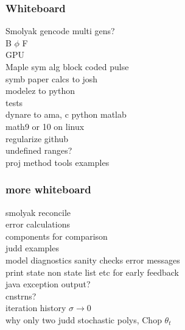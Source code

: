 \documentclass[tikz]{beamer}
\begin{document}
\begin{frame}
  \frametitle{Whiteboard}
  \begin{description}
  \item[Smolyak gencode multi gens?]
  \item[B $\phi$ F]
  \item[GPU]
  \item[Maple sym alg block coded pulse]
  \item[symb paper calcs to josh]
  \item[modelez to python]
  \item[tests]
  \item[dynare to ama, c python matlab]
  \item[math9 or 10 on linux]
  \item[regularize github]
  \item[undefined ranges?]
  \item[proj method tools examples] 
  \end{description}
\end{frame}

\begin{frame}
  \frametitle{more whiteboard}
  \begin{description}
  \item[smolyak reconcile]
  \item[error calculations]
  \item[components for comparison]
  \item[judd examples]
  \item[model diagnostics sanity checks error messages ]
  \item[print state non state list etc for early feedback]
  \item[java exception output?]
  \item[cnstrns?]
  \item[iteration history $\sigma \rightarrow 0$]
  \item[why only two judd stochastic polys,  Chop $\theta_t$]
  \end{description}
\end{frame}
\end{document}
